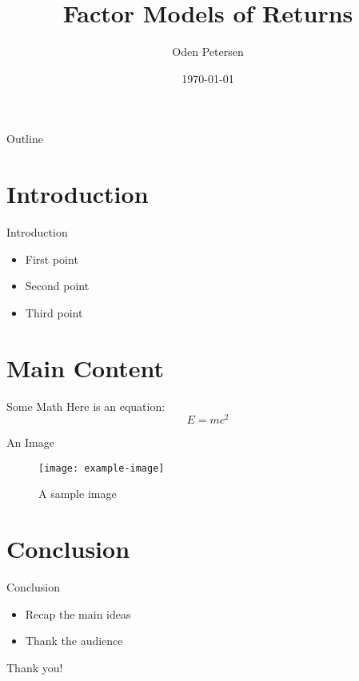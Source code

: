 \documentclass{beamer}
\title[Short Title]{Factor Models of Returns}
\author[Your Name]{Oden Petersen}
\date{\today}
\begin{document}
\begin{frame}
	\titlepage
\end{frame}

\begin{frame}{Outline}
	\tableofcontents
\end{frame}

\section{Introduction}
\begin{frame}{Introduction}
	\begin{itemize}
		\item First point
		\item Second point
		\item Third point
	\end{itemize}
\end{frame}

\section{Main Content}
\begin{frame}{Some Math}
	Here is an equation:
	\[
		E = mc^2
	\]
\end{frame}

\begin{frame}{An Image}
	\begin{figure}
		\texttt{[image: example-image]}
		\caption{A sample image}
	\end{figure}
\end{frame}

\section{Conclusion}
\begin{frame}{Conclusion}
	\begin{itemize}
		\item Recap the main ideas
		\item Thank the audience
	\end{itemize}
\end{frame}

\begin{frame}
	\centering
	\Huge{Thank you!}
\end{frame}
\end{document}

